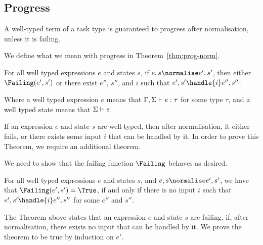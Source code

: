 \subsection{Progress}

A well-typed term of a task type is guaranteed to progress after normalisation,
unless it is failing.

We define what we mean with progress in Theorem~\ref{thm:prog-norm}.
\begin{theorem}
  For all well typed expressions $e$ and states $s$,
  if $e,s \normalise e',s'$,
  then either $\Failing(e', s')$
  or there exist $e''$, $s''$, and $i$ such that $e',s'\handle{i} e'',s''$.
  \label{thm:prog-norm}
\end{theorem}

Where a well typed expression $e$ means that $\Gamma,\Sigma\vdash e:\tau$ for
some type $\tau$, and a well typed state means that $\Sigma\vdash s$.

If an expression $e$ and state $s$ are well-typed, then after normalisation, it
either fails, or there exists some input $i$ that can be handled by it.
In order to prove this Theorem, we require an additional theorem.


We need to show that the failing function $\Failing$ behaves as desired.

\begin{theorem}
  For all well typed expressions $e$ and states $s$,
  and $e,s \normalise e',s'$,
  we have that $\Failing(e',s') = \True$,
  if and only if there is no input $i$
  such that $e',s'\handle{i} e'',s''$ for some $e''$ and $s''$.
  \label{thm:failing}
\end{theorem}

The Theorem above states that an expression $e$ and state $s$ are failing, if,
after normalisation, there exists no input that can be handled by it.
We prove the theorem to be true by induction on $e'$.


